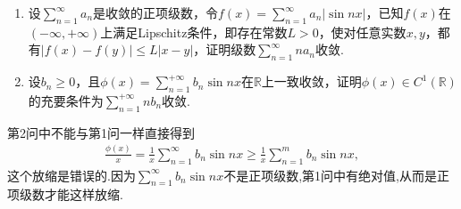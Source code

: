 \documentclass[../../main.tex]{subfiles}%
\begin{document}
\begin{example}
\begin{enumerate}
\item 设$\sum\limits_{n = 1}^{\infty}a_{n}$是收敛的正项级数，令$f(x)=\sum\limits_{n = 1}^{\infty}a_{n}|\sin nx|$，已知$f(x)$在$(-\infty,+\infty)$上满足Lipschitz条件，即存在常数$L>0$，使对任意实数$x,y$，都有$|f(x) - f(y)|\leqslant L|x - y|$，证明级数$\sum\limits_{n = 1}^{\infty}na_{n}$收敛.

\item 设$b_{n}\geqslant0$，且$\phi(x)=\sum\limits_{n = 1}^{+\infty}b_{n}\sin nx$在$\mathbb{R}$上一致收敛，证明$\phi(x)\in C^{1}(\mathbb{R})$的充要条件为$\sum\limits_{n = 1}^{+\infty}nb_{n}$收敛.
\end{enumerate}
\end{example}
\begin{remark}
第2问中不能与第1问一样直接得到
\begin{align*}
\frac{\phi \left( x \right)}{x}=\frac{1}{x}\sum_{n=1}^{\infty}{b_n\sin nx}\geqslant \frac{1}{x}\sum_{n=1}^m{b_n\sin nx},
\end{align*}
这个放缩是错误的.因为$\sum_{n=1}^{\infty}{b_n\sin nx}$不是正项级数,第1问中有绝对值,从而是正项级数才能这样放缩.
\end{remark}
\end{document}
